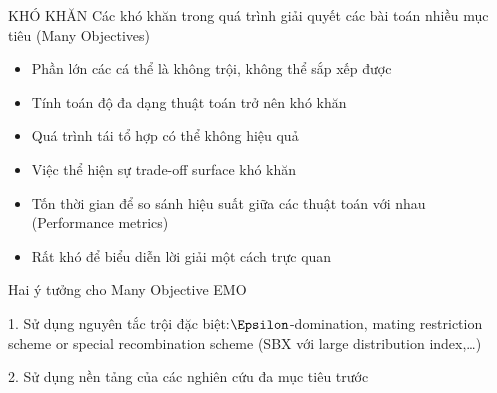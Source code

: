 \documentclass{beamer}
\begin{document}
    \begin{frame}{KHÓ KHĂN}
    {Các khó khăn trong quá trình giải quyết các bài toán nhiều mục tiêu (Many Objectives)}
        \begin{itemize}
            \item <1-> Phần lớn các cá thể là không trội, không thể sắp xếp được
            \item <2-> Tính toán độ đa dạng thuật toán trở nên khó khăn
            \item <3-> Quá trình tái tổ hợp có thể không hiệu quả
            \item <4-> Việc thể hiện sự trade-off surface khó khăn
            \item <5-> Tốn thời gian để so sánh hiệu suất giữa các thuật toán với nhau (Performance metrics)
            \item <6-> Rất khó để biểu diễn lời giải một cách trực quan
        \end{itemize}
    \end{frame}
    \begin{frame}{Hai ý tưởng cho Many Objective EMO}
        \begin{block}{1.}
            Sử dụng nguyên tắc trội đặc biệt:$\Epsilon$-domination, mating restriction scheme or special recombination scheme (SBX với large distribution index,…)
        \end{block}
        \pause
        \begin{block}{2.}
            Sử dụng nền tảng của các nghiên cứu đa mục tiêu trước
        \end{block}
    \end{frame}
\end{document}
